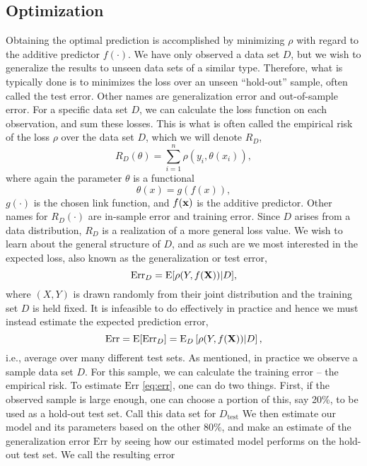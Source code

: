 \subsection{Optimization}
Obtaining the optimal prediction is accomplished by minimizing $\rho$ with regard to the additive predictor $f(\cdot)$. We have only observed a data set $D$, but we wish to generalize the results to unseen data sets of a similar type. Therefore, what is typically done is to minimizes the loss over an unseen ``hold-out'' sample, often called the test error. Other names are generalization error and out-of-sample error. For a specific data set $D$, we can calculate the loss function on each observation, and sum these losses. This is what is often called the empirical risk of the loss $\rho$ over the data set $D$, which we will denote $R_D$,
\begin{equation}\label{eq:empirical-risk}
    R_D(\theta)=\sum_{i=1}^n\rho(y_{i},\theta(x_i)),
\end{equation}
where again the parameter $\theta$ is a functional
\begin{equation}
    \theta(x)=g(f(x)),
\end{equation}
$g(\cdot)$ is the chosen link function, and $f(\mathbf{x})$ is the additive predictor.
Other names for $R_D(\cdot)$ are in-sample error and training error.
Since $D$ arises from a data distribution, $R_D$ is a realization of a more general loss value. We wish to learn about the general structure of $D$, and as such are we most interested in the expected loss, also known as the generalization or test error,
\begin{equation*}
    \text{Err}_{D}=\operatorname{E}[\rho(Y,f(\mathbf{X}))|D],
\end{equation*}
where $(X,Y)$ is drawn randomly from their joint distribution and the training set $D$ is held fixed. It is infeasible to do effectively in practice
and hence we must instead estimate the expected prediction error,
\begin{equation}\label{eq:err}
    \text{Err}=\operatorname{E}[\text{Err}_D]=\operatorname{E}_D\left[\rho(Y,f(\mathbf{X}))|D\right],
\end{equation}
i.e., average over many different test sets. As mentioned, in practice we observe a sample data set $D$. For this sample, we can calculate the training error -- the empirical risk. To estimate $\text{Err}$ \eqref{eq:err}, one can do two things. First, if the observed sample is large enough, one can choose a portion of this, say 20\%, to be used as a hold-out test set. Call this data set for $D_{\text{test}}$ We then estimate our model and its parameters based on the other 80\%, and make an estimate of the generalization error $\text{Err}$ by seeing how our estimated model performs on the hold-out test set. We call the resulting error
